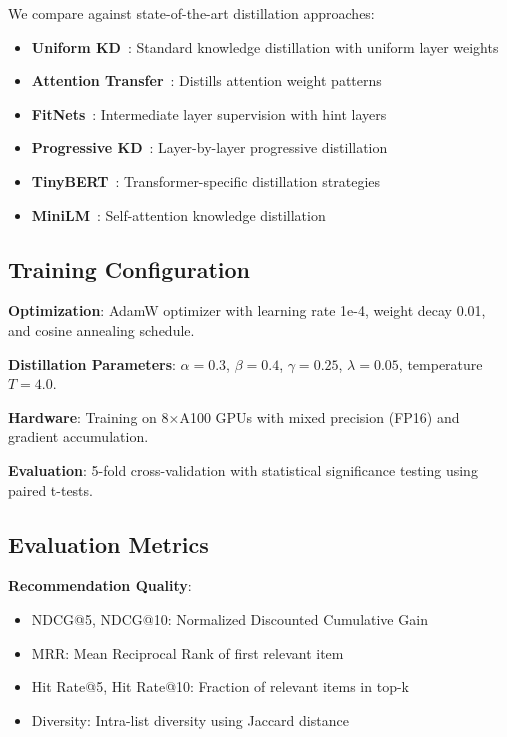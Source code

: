 \documentclass[10pt,conference]{IEEEtran}
\begin{document}
We compare against state-of-the-art distillation approaches:

\begin{itemize}[leftmargin=*]
    \item \textbf{Uniform KD}~\cite{hinton2015distilling}: Standard knowledge distillation with uniform layer weights
    \item \textbf{Attention Transfer}~\cite{zagoruyko2016attention}: Distills attention weight patterns
    \item \textbf{FitNets}~\cite{romero2014fitnets}: Intermediate layer supervision with hint layers
    \item \textbf{Progressive KD}~\cite{sun2019patient}: Layer-by-layer progressive distillation
    \item \textbf{TinyBERT}~\cite{jiao2019tinybert}: Transformer-specific distillation strategies
    \item \textbf{MiniLM}~\cite{wang2020minilm}: Self-attention knowledge distillation
\end{itemize}

\subsection{Training Configuration}

\textbf{Optimization}: AdamW optimizer with learning rate 1e-4, weight decay 0.01, and cosine annealing schedule.

\textbf{Distillation Parameters}: $\alpha=0.3$, $\beta=0.4$, $\gamma=0.25$, $\lambda=0.05$, temperature $T=4.0$.

\textbf{Hardware}: Training on 8×A100 GPUs with mixed precision (FP16) and gradient accumulation.

\textbf{Evaluation}: 5-fold cross-validation with statistical significance testing using paired t-tests.

\subsection{Evaluation Metrics}

\textbf{Recommendation Quality}:
\begin{itemize}[leftmargin=*]
    \item NDCG@5, NDCG@10: Normalized Discounted Cumulative Gain
    \item MRR: Mean Reciprocal Rank of first relevant item
    \item Hit Rate@5, Hit Rate@10: Fraction of relevant items in top-k
    \item Diversity: Intra-list diversity using Jaccard distance
\end{itemize}
\end{document}
